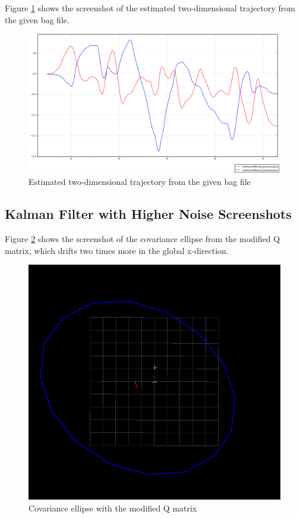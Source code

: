 \documentclass[14pt,a4paper]{article}
\begin{document}
	Figure \ref{graph:filtered_pose} shows the screenshot of the estimated two-dimensional trajectory from the given bag file.
	
	\begin{figure}[htbp]
	\centering
	\includegraphics[scale=0.4]{filtered_pose.png}
  	\caption{Estimated two-dimensional trajectory from the given bag file}
    \label{graph:filtered_pose}
	\end{figure}
	

	\subsection{Kalman Filter with Higher Noise Screenshots}
	Figure \ref{graph:Q_2Times} shows the screenshot of the covariance ellipse from the modified Q matrix, which drifts two times more in the global x-direction.\\
	
	\begin{figure}[htbp]
	\includegraphics[scale=0.5]{Q_x_2Times.png}
  	\caption{Covariance ellipse with the modified Q matrix}
    \label{graph:Q_2Times}
	\end{figure}
	
\end{document}

